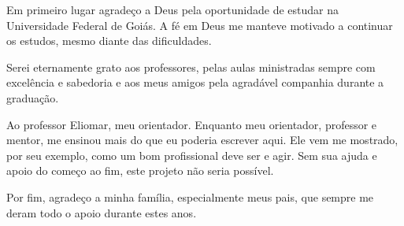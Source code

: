\begin{agradecimentos}

Em primeiro lugar agradeço a Deus pela oportunidade de estudar na Universidade Federal de Goiás. A fé em Deus me manteve motivado a continuar os estudos, mesmo diante das dificuldades.

Serei eternamente grato aos professores, pelas aulas ministradas sempre com excelência e sabedoria e aos meus amigos pela agradável companhia durante a graduação.

Ao professor Eliomar, meu orientador. Enquanto meu orientador, professor e mentor, me ensinou mais do que eu poderia escrever aqui. Ele vem me mostrado, por seu exemplo, como um bom profissional deve ser e agir. Sem sua ajuda e apoio do começo ao fim, este projeto não seria possível.

Por fim, agradeço a minha família, especialmente meus pais, que sempre me deram todo o apoio durante estes anos.

\end{agradecimentos}

